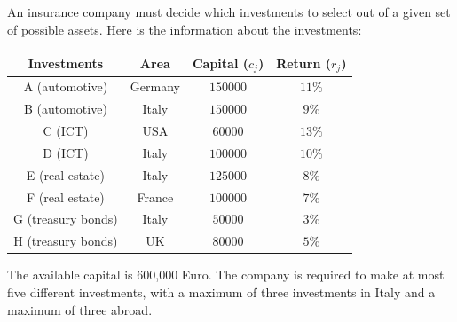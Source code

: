 \begin{example}
    An insurance company must decide which investments to select out of a given set of possible assets.
    Here is the information about the investments:
    \begin{table}[H]
        \centering
        \begin{tabular}{|c|ccc|}
        \hline
        \textbf{Investments} & \textbf{Area} & \textbf{Capital ($c_j$)} & \textbf{Return ($r_j$)} \\ \hline
        A (automotive)       & Germany       & $150 000$                & $11\%$                  \\
        B (automotive)       & Italy         & $150 000$                & $9\%$                   \\
        C (ICT)              & USA           & $60 000$                 & $13\%$                  \\
        D (ICT)              & Italy         & $100 000$                & $10\%$                  \\
        E (real estate)      & Italy         & $125 000$                & $8\%$                   \\
        F (real estate)      & France        & $100 000$                & $7\%$                   \\
        G (treasury bonds)   & Italy         & $50 000$                 & $3\%$                   \\
        H (treasury bonds)   & UK            & $80 000$                 & $5\%$                   \\ \hline
        \end{tabular}
    \end{table}
    The available capital is 600,000 Euro.
    The company is required to make at most five different investments, with a maximum of three investments in Italy and a maximum of three abroad.


\end{example}
